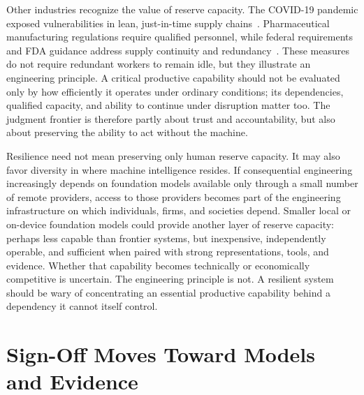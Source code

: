 Other industries recognize the value of reserve capacity. The COVID-19 pandemic exposed vulnerabilities in lean, just-in-time supply chains~\citep{nasem-supply-chain-resilience}. Pharmaceutical manufacturing regulations require qualified personnel, while federal requirements and FDA guidance address supply continuity and redundancy~\citep{cfr-211-25,fdc-506c-redundancy,fda-device-supply-chain-guidance}. These measures do not require redundant workers to remain idle, but they illustrate an engineering principle. A critical productive capability should not be evaluated only by how efficiently it operates under ordinary conditions; its dependencies, qualified capacity, and ability to continue under disruption matter too. The judgment frontier is therefore partly about trust and accountability, but also about preserving the ability to act without the machine.


Resilience need not mean preserving only human reserve capacity. It may also favor diversity in where machine intelligence resides. If consequential engineering increasingly depends on foundation models available only through a small number of remote providers, access to those providers becomes part of the engineering infrastructure on which individuals, firms, and societies depend. Smaller local or on-device foundation models could provide another layer of reserve capacity: perhaps less capable than frontier systems, but inexpensive, independently operable, and sufficient when paired with strong representations, tools, and evidence. Whether that capability becomes technically or economically competitive is uncertain. The engineering principle is not. A resilient system should be wary of concentrating an essential productive capability behind a dependency it cannot itself control.

\section{Sign-Off Moves Toward Models and Evidence}\label{heading:sign-off-moves-toward-models-and-evidence}


